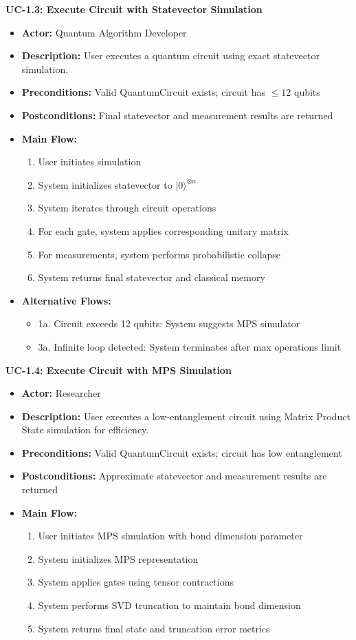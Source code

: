 \textbf{UC-1.3: Execute Circuit with Statevector Simulation}
\begin{itemize}
\item \textbf{Actor:} Quantum Algorithm Developer
\item \textbf{Description:} User executes a quantum circuit using exact statevector simulation.
\item \textbf{Preconditions:} Valid QuantumCircuit exists; circuit has $\leq 12$ qubits
\item \textbf{Postconditions:} Final statevector and measurement results are returned
\item \textbf{Main Flow:}
\begin{enumerate}
\item User initiates simulation
\item System initializes statevector to $|0\rangle^{\otimes n}$
\item System iterates through circuit operations
\item For each gate, system applies corresponding unitary matrix
\item For measurements, system performs probabilistic collapse
\item System returns final statevector and classical memory
\end{enumerate}
\item \textbf{Alternative Flows:}
\begin{itemize}
\item 1a. Circuit exceeds 12 qubits: System suggests MPS simulator
\item 3a. Infinite loop detected: System terminates after max operations limit
\end{itemize}
\end{itemize}

\textbf{UC-1.4: Execute Circuit with MPS Simulation}
\begin{itemize}
\item \textbf{Actor:} Researcher
\item \textbf{Description:} User executes a low-entanglement circuit using Matrix Product State simulation for efficiency.
\item \textbf{Preconditions:} Valid QuantumCircuit exists; circuit has low entanglement
\item \textbf{Postconditions:} Approximate statevector and measurement results are returned
\item \textbf{Main Flow:}
\begin{enumerate}
\item User initiates MPS simulation with bond dimension parameter
\item System initializes MPS representation
\item System applies gates using tensor contractions
\item System performs SVD truncation to maintain bond dimension
\item System returns final state and truncation error metrics
\end{enumerate}
\end{itemize}

